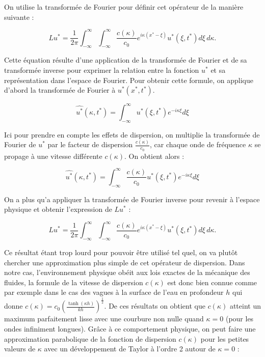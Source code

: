 On utilise la transformée de Fourier pour définir cet opérateur de la manière suivante :

\begin{equation}
    Lu^* = \frac{1}{2\pi} \int_{-\infty}^{\infty} \int_{-\infty}^{\infty} \frac{c(\kappa)}{c_0} e^{i\kappa(x^* - \xi)} u^*(\xi, t^*) d\xi \, d\kappa.
\end{equation}

Cette équation résulte d'une application de la transformée de Fourier et de sa transformée inverse pour exprimer la relation entre la fonction $u^*$ et sa représentation dans l'espace de Fourier. Pour obtenir cette formule, on applique d'abord la transformée de Fourier à $u^*(x^*,t^*)$.

\begin{equation*}
    \widehat{u^*}(\kappa,t^*) = \int_{-\infty}^{\infty} u^*(\xi,t^*) e^{-i\kappa \xi} d\xi
\end{equation*}

Ici pour prendre en compte les effets de dispersion, on multiplie la transformée de Fourier de $u^*$ par le facteur de dispersion $\frac{c(\kappa)}{c_0}$, car chaque onde de fréquence $\kappa$ se propage à une vitesse différente $c(\kappa)$. On obtient alors :

\begin{equation*}
    \widehat{u^*}(\kappa,t^*) = \int_{-\infty}^{\infty} \frac{c(\kappa)}{c_0} u^*(\xi,t^*) e^{-i\kappa \xi} d\xi
\end{equation*}

On a plus qu'a appliquer la transformée de Fourier inverse pour revenir à l'espace physique et obtenir l'expression de $Lu^*$ :

\begin{equation*}
    Lu^* = \frac{1}{2\pi} \int_{-\infty}^{\infty} \int_{-\infty}^{\infty} \frac{c(\kappa)}{c_0} e^{i\kappa(x^* - \xi)} u^*(\xi, t^*) d\xi \, d\kappa.
\end{equation*}

Ce résultat étant trop lourd pour pouvoir être utilisé tel quel, on va plutôt chercher une approximation plus simple de cet opérateur de dispersion. Dans notre cas, l'environnement physique obéit aux lois exactes de la mécanique des fluides, la formule de la vitesse de dispersion $c(\kappa)$ est donc bien connue comme par exemple dans le cas des vagues à la surface de l'eau en profondeur $h$ qui donne $c(\kappa) = c_0 \left( \frac{\tanh(\kappa h)}{kh}\right)^{\frac{1}{2}}$. De ces résultats on obtient que $c(\kappa)$ atteint un maximum parfaitement lisse avec une courbure non nulle quand $\kappa=0$ (pour les ondes infiniment longues). Grâce à ce comportement physique, on peut faire une approximation parabolique de la fonction de dispersion $c(\kappa)$ pour les petites valeurs de $\kappa$ avec un développement de Taylor à l'ordre 2 autour de $\kappa=0$ :

